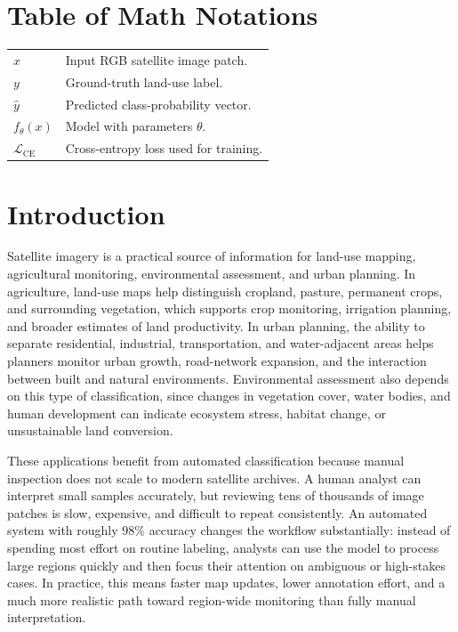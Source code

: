 \documentclass[11pt]{report}
\begin{document}
\chapter*{Table of Math Notations}
\begin{tabularx}{\textwidth}{>{\bfseries}l X}
    \(x\) & Input RGB satellite image patch. \\
    \(y\) & Ground-truth land-use label. \\
    \(\hat{y}\) & Predicted class-probability vector. \\
    \(f_{\theta}(x)\) & Model with parameters \(\theta\). \\
    \(\mathcal{L}_{\mathrm{CE}}\) & Cross-entropy loss used for training. \\
\end{tabularx}

\tableofcontents
\clearpage
{}

\chapter{Introduction}
Satellite imagery is a practical source of information for land-use mapping, agricultural monitoring, environmental assessment, and urban planning. In agriculture, land-use maps help distinguish cropland, pasture, permanent crops, and surrounding vegetation, which supports crop monitoring, irrigation planning, and broader estimates of land productivity. In urban planning, the ability to separate residential, industrial, transportation, and water-adjacent areas helps planners monitor urban growth, road-network expansion, and the interaction between built and natural environments. Environmental assessment also depends on this type of classification, since changes in vegetation cover, water bodies, and human development can indicate ecosystem stress, habitat change, or unsustainable land conversion.

These applications benefit from automated classification because manual inspection does not scale to modern satellite archives. A human analyst can interpret small samples accurately, but reviewing tens of thousands of image patches is slow, expensive, and difficult to repeat consistently. An automated system with roughly \(98\%\) accuracy changes the workflow substantially: instead of spending most effort on routine labeling, analysts can use the model to process large regions quickly and then focus their attention on ambiguous or high-stakes cases. In practice, this means faster map updates, lower annotation effort, and a much more realistic path toward region-wide monitoring than fully manual interpretation.
\end{document}

